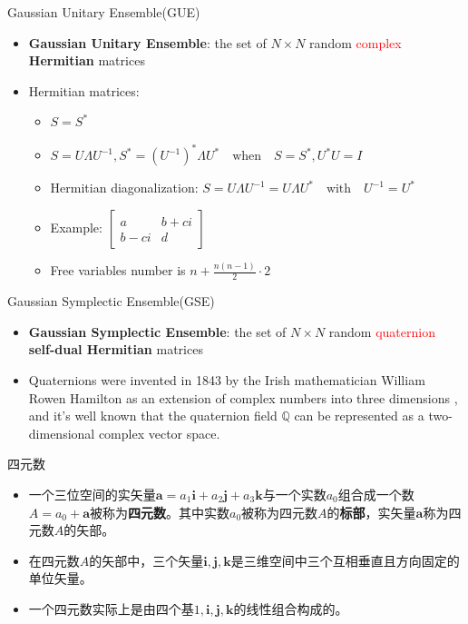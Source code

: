 \documentclass[UTF8,AutoFakeBold,AutoFakeSlant]{beamer}
\begin{document}
\begin{frame}{Gaussian Unitary Ensemble(GUE)}
    \begin{itemize}
        \item \textbf{Gaussian Unitary Ensemble}: the set of $N \times N$ random \textcolor{red}{complex} \textbf{Hermitian} matrices
        \item Hermitian matrices:
              \begin{itemize}
                  \item $S=S^*$
                  \item $S=U\Lambda U^{-1}, S^*=(U^{-1})^*\Lambda U^*\quad \text{when}\quad S=S^*, U^*U=I$
                  \item Hermitian diagonalization: $S=U\Lambda U^{-1} = U\Lambda U^* \quad\text{with}\quad U^{-1} = U^*$
                  \item Example: $\begin{bmatrix}
                                a    & b+ci \\
                                b-ci & d
                            \end{bmatrix}$
                  \item Free variables number is $n+\frac{n(n-1)}{2}\cdot 2$
              \end{itemize}
    \end{itemize}
\end{frame}

\begin{frame}{Gaussian Symplectic Ensemble(GSE)}
    \begin{itemize}
        \item \textbf{Gaussian Symplectic Ensemble}: the set of $N \times N$ random \textcolor{red}{quaternion} \textbf{self-dual Hermitian} matrices 
        \item Quaternions were invented in 1843 by the Irish mathematician
              William Rowen Hamilton as an extension of complex numbers into three dimensions , and it's well known that the quaternion field $\mathbb{Q} $ can be represented as a two-dimensional
              complex vector space.
    \end{itemize}
\end{frame}

\begin{frame}{四元数}
    \begin{itemize}
        \item 一个三位空间的实矢量$\mathbf{a}=a_1\mathbf{i}+a_2\mathbf{j}+a_3\mathbf{k}$与一个实数$a_0$组合成一个数$A=a_0+\mathbf{a}$被称为\textbf{四元数}。其中实数$a_0$被称为四元数$A$的\textbf{标部}，实矢量$\mathbf{a}$称为四元数$A$的矢部。
        \item 在四元数$A$的矢部中，三个矢量$\mathbf{i},\mathbf{j},\mathbf{k}$是三维空间中三个互相垂直且方向固定的单位矢量。
        \item 一个四元数实际上是由四个基$1,\mathbf{i},\mathbf{j},\mathbf{k}$的线性组合构成的。
    \end{itemize}
\end{frame}
\end{document}
